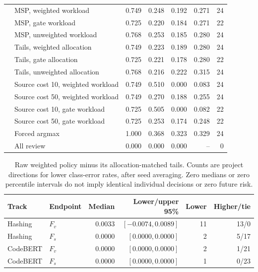 \begin{longtable}{@{}llrrrrr@{}}
  & MSP, weighted workload & 0.749 & 0.248 & 0.192 & 0.271 & 24\\
  & MSP, gate workload & 0.725 & 0.220 & 0.184 & 0.271 & 22\\
  & MSP, unweighted workload & 0.768 & 0.253 & 0.185 & 0.280 & 24\\
  & Tails, weighted allocation & 0.749 & 0.223 & 0.189 & 0.280 & 24\\
  & Tails, gate allocation & 0.725 & 0.221 & 0.178 & 0.280 & 22\\
  & Tails, unweighted allocation & 0.768 & 0.216 & 0.222 & 0.315 & 24\\
  & Source cost 10, weighted workload & 0.749 & 0.510 & 0.000 & 0.083 & 24\\
  & Source cost 50, weighted workload & 0.749 & 0.270 & 0.188 & 0.255 & 24\\
  & Source cost 10, gate workload & 0.725 & 0.505 & 0.000 & 0.082 & 22\\
  & Source cost 50, gate workload & 0.725 & 0.253 & 0.174 & 0.248 & 22\\
  & Forced argmax & 1.000 & 0.368 & 0.323 & 0.329 & 24\\
  & All review & 0.000 & 0.000 & 0.000 & -- & 0\\
\bottomrule
\end{longtable}

\begin{table}[ht]
\centering\small
\caption{Raw weighted policy minus its allocation-matched tails. Counts are project directions for lower class-error rates, after seed averaging. Zero medians or zero percentile intervals do not imply identical individual decisions or zero future risk.}
\begin{tabular}{@{}llrrrr@{}}
\toprule Track & Endpoint & Median & Lower/upper 95\% & Lower & Higher/tie\\\midrule
Hashing & $F_v$ & 0.0033 & $[-0.0074,0.0089]$ & 11 & 13/0\\
Hashing & $F_s$ & 0.0000 & $[0.0000,0.0000]$ & 2 & 5/17\\
CodeBERT & $F_v$ & 0.0000 & $[0.0000,0.0000]$ & 2 & 1/21\\
CodeBERT & $F_s$ & 0.0000 & $[0.0000,0.0000]$ & 1 & 0/23\\
\bottomrule
\end{tabular}
\end{table}
